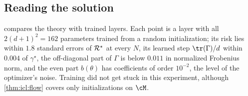 \begin{refsection}
\section{Reading the solution}\label{sec:icl:reading}

 compares the theory with trained layers. Each point is a layer with all $2(d+1)^2=162$ parameters trained from a random initialization; its risk lies within $1.8$ standard errors of $\mathcal{R}^\star$ at every $N$, its learned step $\tr(\Gamma)/d$ within $0.004$ of $\gamma^\star$, the off-diagonal part of $\Gamma$ is below $0.011$ in normalized Frobenius norm, and the even part $b(\theta)$ has coefficients of order $10^{-2}$, the level of the optimizer's noise. Training did not get stuck in this experiment, although \cref{thm:icl:flow} covers only initializations on $\cM$.


\end{refsection}
